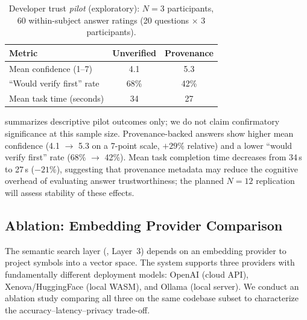 \documentclass[conference]{IEEEtran}
\providecommand{\measuredFrom}[1]{}
\begin{document}
\begin{table}[t]
  \centering
  \caption{Developer trust \emph{pilot} (exploratory): $N=3$ participants,
    60 within-subject answer ratings (20 questions $\times$ 3 participants).\protect\footnotemark}
  \label{tab:trust}
  \measuredFrom{research/2026-04-23_paper-5-preregistration-v1.md}%
  \begin{tabular}{lcc}
    \toprule
    \textbf{Metric} & \textbf{Unverified} & \textbf{Provenance} \\
    \midrule
    Mean confidence (1--7)      & 4.1 & 5.3 \\
    ``Would verify first'' rate & 68\% & 42\% \\
    Mean task time (seconds)    & 34  & 27 \\
    \bottomrule
  \end{tabular}
\end{table}


 summarizes descriptive pilot outcomes only; we do not claim
confirmatory significance at this sample size.
Provenance-backed answers show higher mean confidence (4.1 $\to$ 5.3 on a
7-point scale, $+29\%$ relative) and a lower ``would verify first'' rate
(68\% $\to$ 42\%).
Mean task completion time decreases from 34\,s to 27\,s ($-21\%$), suggesting
that provenance metadata may reduce the cognitive overhead of evaluating answer
trustworthiness; the planned $N{=}12$ replication will assess stability of these
effects.


\subsection{Ablation: Embedding Provider Comparison}
\label{sec:eval:embedding}

The semantic search layer (, Layer~3) depends
on an embedding provider to project symbols into a vector space. The
system supports three providers with fundamentally different deployment
models: OpenAI (cloud API), Xenova/HuggingFace (local WASM), and Ollama
(local server). We conduct an ablation study comparing all three on the
same codebase subset to characterize the accuracy--latency--privacy
trade-off.
\end{document}

